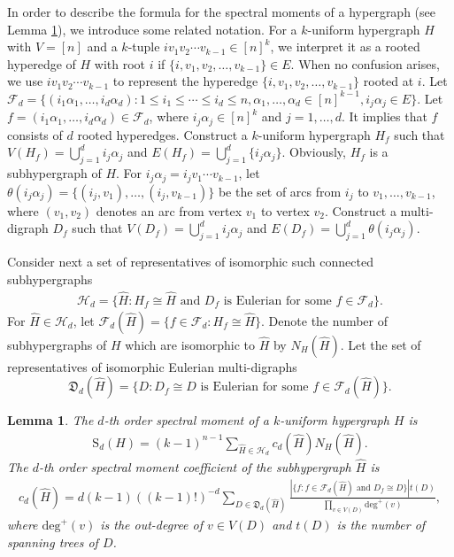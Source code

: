 \documentclass{article}
\newtheorem{lem}[thm]{Lemma}
\begin{document}
In order to describe the formula for the spectral moments of a hypergraph (see Lemma \ref{yinli1}),
we introduce some related notation.
For a $k$-uniform hypergraph $H$ with $V=[n]$ and a $k$-tuple $i v_1v_2\cdots v_{k-1}\in [n]^k$,
we interpret it as a rooted hyperedge of $H$ with root $i$ if $\{i, v_1,v_2,\ldots,v_{k-1}\} \in E$.
When no confusion arises,
we use $i v_1v_2\cdots v_{k-1}$ to represent the hyperedge $\{i, v_1,v_2,\ldots,v_{k-1}\}$ rooted at $i$.
Let $\mathcal{F}_{d}=\{ (i_{1}\alpha_{1},\ldots,i_{d}\alpha_{d}): 1 \leq i_{1} \leq \cdots\leq i_{d} \leq n, \alpha_{1},\ldots,\alpha_{d}\in[n]^{k-1}, i_j\alpha_j \in E \}$.
Let $f=(i_{1}\alpha_{1},\ldots,i_{d}\alpha_{d})\in\mathcal{F}_{d}$,
where $i_{j}\alpha_{j}\in[n]^{k}$ and $j=1,\ldots,d$.
It implies that $f$ consists of $d$ rooted hyperedges.
Construct a $k$-uniform hypergraph $H_{f}$ such that $V(H_{f})=\bigcup_{j=1}^{d}i_j\alpha_j$ and $E(H_{f})=\bigcup_{j=1}^{d}\{i_j\alpha_j\}$.
Obviously, $H_{f}$ is a subhypergraph of $H$.
For $i_{j}\alpha_{j}=i_{j}v_{1}\cdots v_{k-1}$,
let $\theta(i_{j}\alpha_{j})=\{(i_{j},v_{1}),\ldots,(i_{j},v_{k-1})\}$ be the set of arcs from $i_{j}$ to $v_{1},\ldots,v_{k-1}$, where $(v_{1},v_{2})$ denotes an arc from vertex $v_{1}$ to vertex $v_{2}$.
Construct a multi-digraph $D_{f}$ such that $V(D_{f})=\bigcup_{j=1}^{d}i_j\alpha_j$ and $E(D_f)=\bigcup_{j=1}^{d}\theta(i_{j}\alpha_{j})$.

Consider next a set of representatives of isomorphic such connected subhypergraphs
\begin{align*}
\mathcal{H}_{d}=\{ \widehat{H}: \mbox{$H_{f}\cong\widehat{H}$ and $D_f$ is Eulerian for some $f\in\mathcal{F}_{d}$} \}.
\end{align*}
For $\widehat{H}\in\mathcal{H}_{d}$,
let $\mathcal{F}_{d}(\widehat{H})=\{f \in \mathcal{F}_{d} :H_{f}\cong\widehat{H}\}$.
Denote the number of subhypergraphs of $H$ which are isomorphic to $\widehat{H}$ by $N_{H}(\widehat{H})$.
Let the set of representatives of isomorphic Eulerian multi-digraphs
\[\mathfrak{D}_{d}(\widehat{H})=\{D:\mbox{$D_{f}\cong D$ is  Eulerian for some $f\in\mathcal{F}_{d}(\widehat{H})$}\}.\]



\begin{lem}\cite{chen2024spectra}\label{yinli1}
The $d$-th order spectral moment of a $k$-uniform hypergraph $H$ is
\begin{align*}
\mathrm{S}_{d}(H)=(k-1)^{n-1}\sum_{\widehat{H}\in\mathcal{H}_{d}}c_{d}(\widehat{H})N_{H}(\widehat{H}).
\end{align*}
The $d$-th order spectral moment coefficient of the subhypergraph $\widehat{H}$ is
\begin{align*}
c_{d}(\widehat{H})=d(k-1)((k-1)!)^{-d}\sum_{D\in\mathfrak{D}_{d}(\widehat{H})}\frac{|\{f:\mbox{$f\in\mathcal{F}_{d}(\widehat{H})$ and $D_{f}\cong D$}\}|t(D)}{\prod_{v\in V(D)}\mathrm{deg}^{+}(v)},
\end{align*}
where $\mathrm{deg}^{+}(v)$ is the out-degree of $v \in V(D)$ and $t(D)$ is the number of spanning trees of $D$.
\end{lem}
\end{document}
